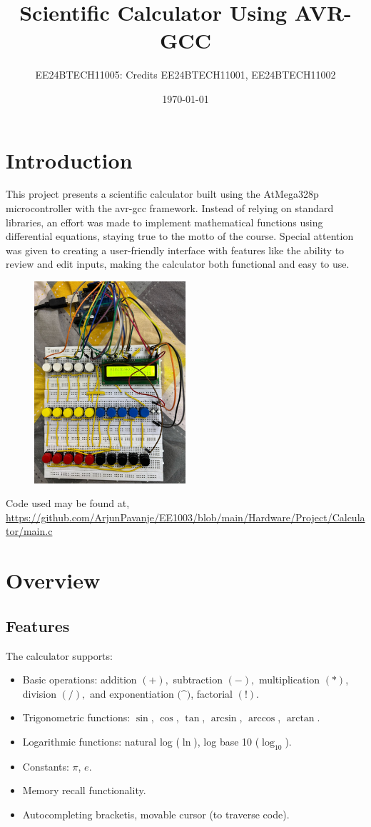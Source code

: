 \documentclass[a4paper,12pt]{article}
\title{Scientific Calculator Using AVR-GCC}
\author{EE24BTECH11005: Credits EE24BTECH11001, EE24BTECH11002}
\date{\today}
\begin{document}
\maketitle

\section*{Introduction}
This project presents a scientific calculator built using the AtMega328p microcontroller with the avr-gcc framework. Instead of relying on standard libraries, an effort was made to implement mathematical functions using differential equations, staying true to the motto of the course. Special attention was given to creating a user-friendly interface with features like the ability to review and edit inputs, making the calculator both functional and easy to use.
\begin{figure}[h!]
  \begin{center}
    \includegraphics[width=0.5\textwidth]{figs/circuit.png}
  \end{center}
  \caption{}
  \label{fig:Circuit}
\end{figure}
\pagebreak
Code used may be found at, \url{https://github.com/ArjunPavanje/EE1003/blob/main/Hardware/Project/Calculator/main.c}
\section*{Overview}
\subsection*{Features}
The calculator supports:
\begin{itemize}
    \item Basic operations: addition $(+),$ subtraction $(-),$ multiplication $(*)$, division $(/),$ and exponentiation $($\textasciicircum$)$, factorial $(!)$.
    \item Trigonometric functions: $\sin$, $\cos$, $\tan$, $\arcsin$, $\arccos$, $\arctan$.
    \item Logarithmic functions: natural log ($\ln$), log base 10 ($\log_{10}$).
    \item Constants: $\pi$, $e$.
    \item Memory recall functionality.
    \item Autocompleting bracketis, movable cursor (to traverse code).
\end{itemize}
\end{document}
